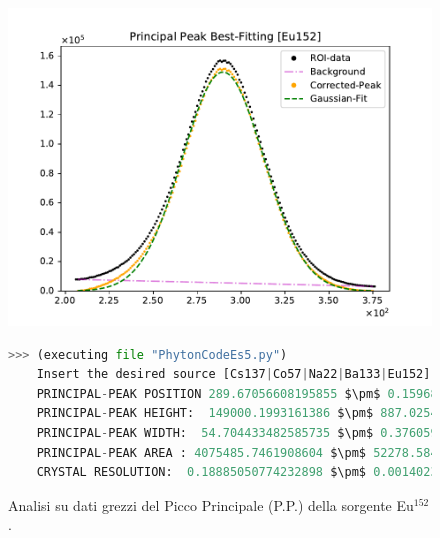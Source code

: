 \begin{figure}[h!]
	\centering
	\caption{Analisi su dati grezzi del Picco Principale (P.P.) della sorgente Eu$^{152}$. }
	\includegraphics[width =  \textwidth,trim={1cm 0 1cm 0}, clip]{Immagini/Peak-Fitting_Eu152_RAW.pdf}
	\label{fig:PPRawEu152} \bigskip\bigskip
	\begin{lstlisting}[language=python, style=Pystyle, mathescape=true]
	>>> (executing file "PhytonCodeEs5.py")
	Insert the desired source [Cs137|Co57|Na22|Ba133|Eu152]: Eu152
	PRINCIPAL-PEAK POSITION 289.67056608195855 $\pm$ 0.15968983090396094
	PRINCIPAL-PEAK HEIGHT:  149000.1993161386 $\pm$ 887.0254434869172
	PRINCIPAL-PEAK WIDTH:  54.704433482585735 $\pm$ 0.3760595236985809
	PRINCIPAL-PEAK AREA : 4075485.7461908604 $\pm$ 52278.58417820594
	CRYSTAL RESOLUTION:  0.18885050774232898 $\pm$ 0.0014023414074840683
	\end{lstlisting} \bigskip\bigskip
\end{figure}

\newpage


